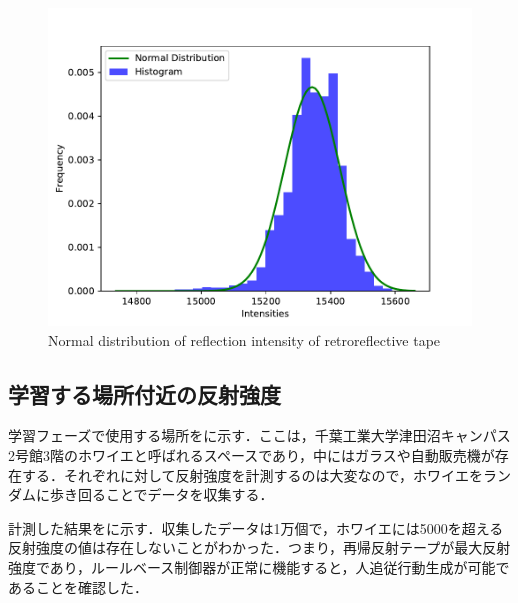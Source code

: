   \begin{figure}[h]
    \centering
    \includegraphics[keepaspectratio, scale=0.50] {images/pdf/RobotGuidance_plot_reflection_intensities_of_tape}
    \captionsetup{justification=raggedright} %
    \caption{Normal distribution of reflection intensity of retroreflective tape}
    \label{Fig:Normal distribution of reflection intensity of retroreflective tape}
  \end{figure}

\newpage

\subsection{学習する場所付近の反射強度}

  学習フェーズで使用する場所をに示す．ここは，千葉工業大学津田沼キャンパス2号館3階のホワイエと呼ばれるスペースであり，中にはガラスや自動販売機が存在する．それぞれに対して反射強度を計測するのは大変なので，ホワイエをランダムに歩き回ることでデータを収集する．

  計測した結果をに示す．収集したデータは1万個で，ホワイエには5000を超える反射強度の値は存在しないことがわかった．つまり，再帰反射テープが最大反射強度であり，ルールベース制御器が正常に機能すると，人追従行動生成が可能であることを確認した．

